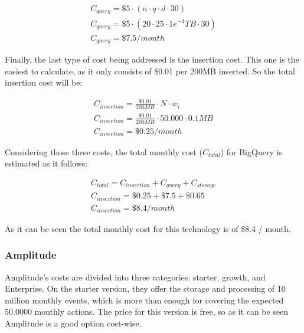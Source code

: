 \documentclass[english, 12pt, a4paper, sci, utf8, a-1b, online]{aaltothesis}
\begin{document}
\begin{equation}
\begin{split}
    C_{query} = \$5 \cdot (n \cdot q \cdot d \cdot 30) \\
    C_{query} = \$5 \cdot (20 \cdot 25 \cdot 1e^{-4}TB \cdot 30)\\
    C_{query} = \$7.5 / month
\end{split}
\end{equation}

Finally, the last type of cost being addressed is the insertion cost. This one is the easiest to calculate, as it only consists of \$0.01 per 200MB inserted. So the total insertion cost will be:

\begin{equation}
\begin{split}
    C_{insertion} = \frac{\$0.01}{200MB} \cdot N \cdot w_i \\
    C_{insertion} = \frac{\$0.01}{200MB} \cdot 50.000 \cdot 0.1MB \\
    C_{insertion} = \$0.25 / month
\end{split}
\end{equation}

Considering those three costs, the total monthly cost ($C_{total}$) for BigQuery is estimated as it follows:

\begin{equation}
\begin{split}
    C_{total} = C_{insertion} + C_{query} + C_{storage}\\
    C_{insertion} = \$0.25 + \$7.5 +\$0.65\\
    C_{insertion} = \$8.4 / month
\end{split}
\end{equation}

As it can be seen the total monthly cost for this technology is of \$8.4 / month.

\subsubsection*{Amplitude}

Amplitude's costs are divided into three categories: starter, growth, and Enterprise. On the starter version, they offer the storage and processing of 10 million monthly events, which is more than enough for covering the expected 50.0000 monthly actions. The price for this version is free, so as it can be seen Amplitude is a good option cost-wise.
\end{document}
